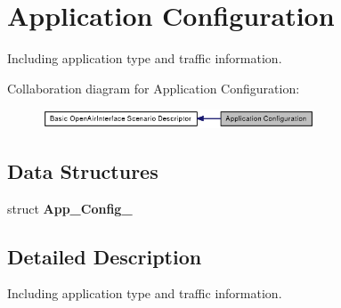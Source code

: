 \section{Application Configuration}
\label{group____app__config}
Including application type and traffic information.  




Collaboration diagram for Application Configuration:\nopagebreak
\begin{figure}[H]
\begin{center}
\leavevmode
\includegraphics[width=229pt]{group____app__config}
\end{center}
\end{figure}
\subsection*{Data Structures}
\begin{CompactItemize}
\item 
struct {\bf App\_\-Config\_\-}
\end{CompactItemize}


\subsection{Detailed Description}
Including application type and traffic information. 